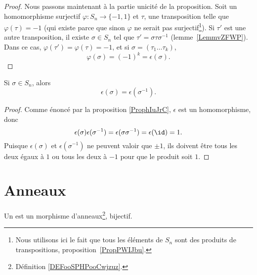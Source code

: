 \begin{proof}
	Nous passons maintenant à la partie unicité de la proposition. Soit un homomorphisme surjectif \( \varphi\colon S_n\to \{ -1,1 \}\) et \( \tau\), une transposition telle que \( \varphi(\tau)=-1\) (qui existe parce que sinon \( \varphi\) ne serait pas surjectif\footnote{Nous utilisons ici le fait que tous les éléments de \( S_n\) sont des produits de transpositions, proposition~\ref{PropPWIJbu}.}). Si \( \tau'\) est une autre transposition, il existe \( \sigma\in S_n\) tel que \( \tau'=\sigma\tau\sigma^{-1}\) (lemme~\ref{LemmvZFWP}). Dans ce cas, \( \varphi(\tau')=\varphi(\tau)=-1\), et si \( \sigma=(\tau_1\ldots \tau_k) \),
	\begin{equation}
		\varphi(\sigma)=(-1)^k=\epsilon(\sigma).
	\end{equation}
\end{proof}

\begin{corollary}       \label{CORooZLUKooBOhUPG}
	Si \( \sigma\in S_n\), alors
	\begin{equation}
		\epsilon(\sigma)=\epsilon(\sigma^{-1}).
	\end{equation}
\end{corollary}

\begin{proof}
	Comme énoncé par la proposition \ref{ProphIuJrC}, \( \epsilon\) est un homomorphisme, donc
	\begin{equation}
		\epsilon(\sigma)\epsilon(\sigma^{-1})=\epsilon(\sigma\sigma^{-1})=\epsilon(\id)=1.
	\end{equation}
	Puisque \( \epsilon(\sigma)\) et \( \epsilon(\sigma^{-1})\) ne peuvent valoir que \( \pm1\), ils doivent être tous les deux égaux à \( 1\) ou tous les deux à \( -1\) pour que le produit soit \( 1\).
\end{proof}

\section{Anneaux}

\begin{definition}      \label{DEFooKWKGooIOwGTA}
	Un  est un morphisme d'anneaux\footnote{Définition \ref{DEFooSPHPooCwjzuz}.}, bijectif.
\end{definition}

